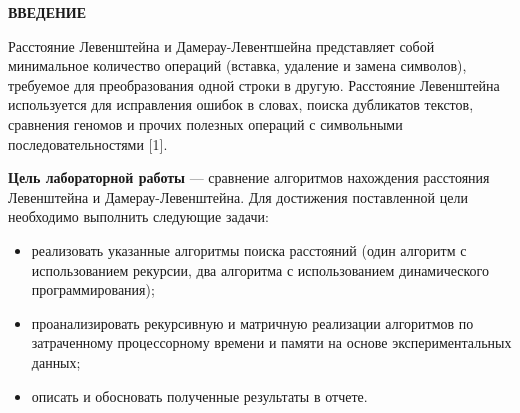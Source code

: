 \begin{center}
    \textbf{ВВЕДЕНИЕ}
\end{center}

Расстояние Левенштейна и Дамерау-Левентшейна представляет собой минимальное количество операций (вставка, удаление и замена символов), требуемое для преобразования одной строки в другую. Расстояние Левенштейна используется для исправления ошибок в словах, поиска дубликатов текстов, сравнения геномов и прочих полезных операций с символьными последовательностями [1].

\textbf{Цель лабораторной работы} --- сравнение алгоритмов нахождения расстояния Левенштейна и Дамерау-Левенштейна. Для достижения поставленной цели необходимо выполнить следующие задачи:

\begin{itemize}
	\item реализовать указанные алгоритмы поиска расстояний (один алгоритм с использованием рекурсии, два алгоритма с использованием динамического программирования);
	\item проанализировать рекурсивную и матричную реализации алгоритмов по затраченному процессорному времени и памяти на основе экспериментальных данных;
	\item описать и обосновать полученные результаты в отчете.
\end{itemize}